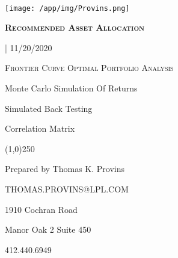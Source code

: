 \documentclass{article}
\begin{document}
\begin{titlepage} %

\begin{center}
	{\scshape\Large\bfseries \, \par}
	\vspace{5cm}


	\texttt{[image: /app/img/Provins.png]}\par



	\vspace{0,5cm}
	{\scshape\Large\bfseries Recommended Asset Allocation

	{} | 11/20/2020 \par}
	\vspace{0,5cm}
	{\scshape\normalsize Frontier Curve Optimal Portfolio Analysis

	Monte Carlo Simulation Of Returns

	Simulated Back Testing

	Correlation Matrix \par}
\end{center}

	\begin{center}
\line(1,0){250}
\end{center}

	\begin{center}
	 	{
		\small{
		Prepared by Thomas K. Provins

		THOMAS.PROVINS@LPL.COM}
		\par}


	\vfill
\end{center}

	\vfill

	{\begin{center}

	     1910 Cochran Road

	     Manor Oak 2 Suite 450

	     412.440.6949

	\end{center}}

\end{titlepage}


\tableofcontents

\begin{center}
\vfill
\vfill

\end{center}
\justify
\end{document}
